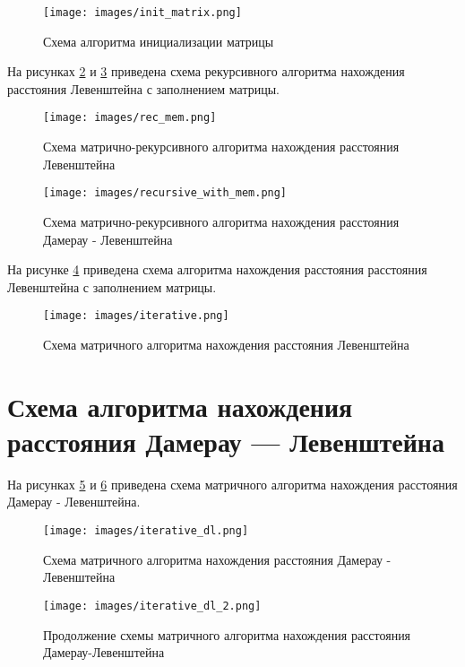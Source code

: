 \documentclass[a4paper,14pt, unknownkeysallowed]{extreport}
\begin{document}
\begin{figure}
\centering
\texttt{[image: images/init\_matrix.png]}
\caption{Схема алгоритма инициализации матрицы}
\label{img:init_matrix}
\end{figure}

На рисунках \ref{img:rec_mem} и \ref{img:recursive_with_mem} приведена схема рекурсивного алгоритма нахождения расстояния Левенштейна с заполнением матрицы.

\begin{figure}[h]
\centering
\texttt{[image: images/rec\_mem.png]}
\caption{Схема матрично-рекурсивного алгоритма нахождения расстояния Левенштейна}
\label{img:rec_mem}
\end{figure}

\clearpage

\begin{figure}
\centering
\texttt{[image: images/recursive\_with\_mem.png]}
\caption{Схема матрично-рекурсивного алгоритма нахождения расстояния Дамерау - Левенштейна}
\label{img:recursive_with_mem}
\end{figure}

На рисунке \ref{img:iterative} приведена схема алгоритма нахождения расстояния расстояния Левенштейна с заполнением матрицы.

\begin{figure}
\centering
\texttt{[image: images/iterative.png]}
\caption{Схема матричного алгоритма нахождения расстояния Левенштейна}
\label{img:iterative}
\end{figure}

\clearpage

\section{Схема алгоритма нахождения расстояния Дамерау — Левенштейна}

На рисунках \ref{img:iterative_dl} и \ref{img:iterative_dl_2} приведена схема матричного алгоритма нахождения расстояния Дамерау - Левенштейна.

\begin{figure}[h]
\centering
\texttt{[image: images/iterative\_dl.png]}
\caption{Схема матричного алгоритма нахождения расстояния Дамерау - Левенштейна}
\label{img:iterative_dl}
\end{figure}

\begin{figure}[h]
\centering
\texttt{[image: images/iterative\_dl\_2.png]}
\caption{Продолжение схемы матричного алгоритма нахождения расстояния Дамерау-Левенштейна}
\label{img:iterative_dl_2}
\end{figure}
\end{document}
